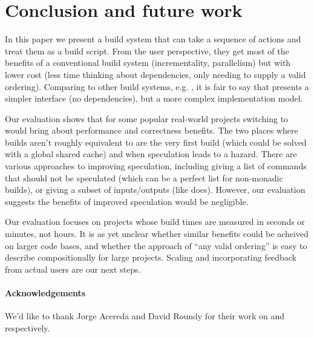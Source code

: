 \section{Conclusion and future work}
\label{sec:conclusion}

In this paper we present a build system that can take a sequence of actions and treat them as a build script. From the user perspective, they get most of the benefits of a conventional build system (incrementality, parallelism) but with lower cost (less time thinking about dependencies, only needing to supply a valid ordering). Comparing \Rattle to other build systems, e.g. \Make, it is fair to say that \Rattle presents a simpler interface (no dependencies), but a more complex implementation model.

Our evaluation shows that for some popular real-world projects switching to \Rattle would bring about performance and correctness benefits. The two places where builds aren't roughly equivalent to \Make are the very first build (which could be solved with a global shared cache) and when speculation leads to a hazard. There are various approaches to improving speculation, including giving a list of commands that should not be speculated (which can be a perfect list for non-monadic builds), or giving a subset of inputs/outputs (like \Fac does). However, our evaluation suggests the benefits of improved speculation would be negligible.

Our evaluation focuses on projects whose build times are measured in seconds or minutes, not hours. It is as yet unclear whether similar benefits could be acheived on larger code bases, and whether the \Rattle approach of ``any valid ordering'' is easy to describe compositionally for large projects. Scaling \Rattle and incorporating feedback from actual users are our next steps.

\paragraph{Acknowledgements} We'd like to thank Jorge Acereda and David Roundy for their work on \Fsatrace and \Bigbro respectively.
